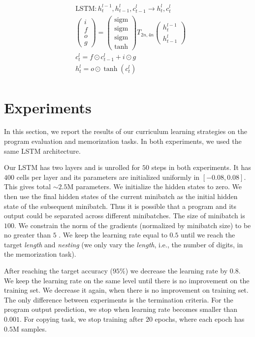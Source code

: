 \begin{align*}
&\text{LSTM} : h^{l-1}_t, h^l_{t-1}, c^l_{t - 1} \rightarrow h^l_t, c^l_t\\
&\begin{pmatrix}i\\f\\o\\g\end{pmatrix} =
  \begin{pmatrix}\mathrm{sigm}\\\mathrm{sigm}\\\mathrm{sigm}\\\tanh\end{pmatrix}
  T_{2n,4n}\begin{pmatrix}h^{l - 1}_t\\h^l_{t-1}\end{pmatrix}\\
&c^l_t = f \odot c^l_{t-1} + i \odot g\\
&h^l_t = o \odot \tanh(c^l_t)\\
\end{align*}

\section{Experiments}

In this section, we report the results of our curriculum learning strategies on the program evaluation and memorization tasks. In both experiments, we used the same LSTM architecture.

Our LSTM has two layers and is unrolled for $50$ steps in both experiments. It has $400$ cells per layer and its parameters are initialized uniformly in $[-0.08, 0.08]$. This gives total $\sim 2.5$M parameters. We initialize the hidden states to zero.  We then use the final hidden states of the current minibatch as the initial hidden state of the subsequent minibatch.  Thus it is possible that a program and its output could be separated across different minibatches. The size of minibatch is $100$.  We constrain the norm of the gradients (normalized by minibatch size) to be no greater than $5$ \citep{mikolov2010recurrent}. We keep the learning rate equal to $0.5$ until we reach the target 
\textit{length} and \textit{nesting} (we only vary the \textit{length}, i.e., the number of digits, in the memorization task).

After reaching the target accuracy ($95\%$) we decrease the learning rate by $0.8$. We keep the learning rate on the same level until there is no improvement on the training set. We decrease it again, when there is no improvement on training set. The only difference between experiments is the termination criteria. For the program output prediction, we stop when learning rate becomes smaller than $0.001$. For copying task, we stop training after $20$ epochs, where each epoch has $0.5$M samples.

